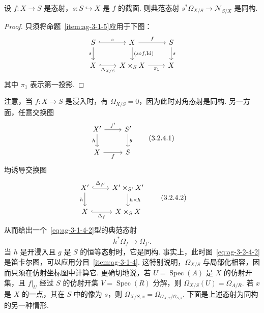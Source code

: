 \begin{proposition}\label{item:ag-3-2-3}
设 $f:X\longrightarrow S$ 是态射，$s:S\hookrightarrow X$ 是 $f$ 的截面. 则典范态射 $s^*\Omega_{X/S}\longrightarrow\mathcal N_{S/X}$ 是同构.
\end{proposition}
\begin{proof}
只须将命题~\ref{item:ag-3-1-5}应用于下图：
\begin{align*}
\begin{tikzcd}[ampersand replacement=\&]
S\arrow[r,hook,"s"]\arrow[d,"s"'] \& X\arrow[r,"f"]\arrow[d,"{(s\circ f,\operatorname{Id})}"] \& S\arrow[d,"s"]\\
X\arrow[r,hook,"\Delta_{X/S}"'] \& X\times_SX\arrow[r,"\pi_1"'] \& X
\end{tikzcd}
\end{align*}
其中 $\pi_1$ 表示第一投影.
\end{proof}
\begin{numpara}[余切层的函子性]\label{item:ag-3-2-4}
注意，当 $f:X\longrightarrow S$ 是浸入时，有 $\Omega_{X/S}=0$，因为此时对角态射是同构. 另一方面，任意交换图
\begin{align}
\begin{tikzcd}[ampersand replacement=\&]
X'\arrow[r,"f'"]\arrow[d,"h"'] \& S'\arrow[d,"g"]\\
X\arrow[r,"f"'] \& S
\end{tikzcd}\tag{3.2.4.1}\label{eq:ag-3-2-4-1}
\end{align}
均诱导交换图
\begin{align}
\begin{tikzcd}[ampersand replacement=\&]
X'\arrow[r,hook,"\Delta_{f'}"]\arrow[d,"h"'] \& X'\times_{S'}X'\arrow[d,"h\times h"]\\
X\arrow[r,hook,"\Delta_f"'] \& X\times_SX
\end{tikzcd}\tag{3.2.4.2}\label{eq:ag-3-2-4-2}
\end{align}
从而给出一个~\eqref{eq:ag-3-1-4-2}型的典范态射
\begin{align}
h^*\Omega_f\longrightarrow\Omega_{f'}.\tag{3.2.4.3}\label{eq:ag-3-2-4-3}
\end{align}
当 $h$ 是开浸入且 $g$ 是 $S$ 的恒等态射时，它是同构. 事实上，此时图~\eqref{eq:ag-3-2-4-2}是笛卡尔图，可以应用分目~\ref{item:ag-3-1-4}. 这特别说明，$\Omega_{X/S}$ 与局部化相容，因而只须在仿射坐标图中计算它. 更确切地说，若 $U=\operatorname{Spec}(A)$ 是 $X$ 的仿射开集，且 $f|_U$ 经过 $S$ 的仿射开集 $V=\operatorname{Spec}(R)$ 分解，则 $\Omega_{X/S}(U)=\Omega_{A/R}$. 若 $x$ 是 $X$ 的一点，其在 $S$ 中的像为 $s$，则 $\Omega_{X/S,x}=\Omega_{\mathcal O_{X,x}/\mathcal O_{S,s}}$.
下面是上述态射为同构的另一种情形.
\end{numpara}
